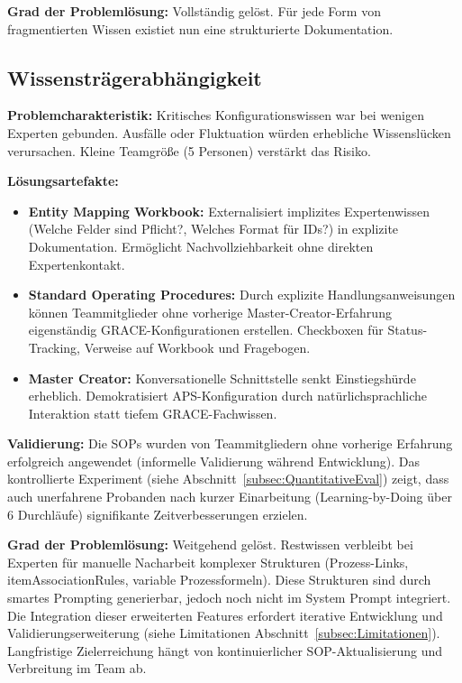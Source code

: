 \noindent \textbf{Grad der Problemlösung:} Vollständig gelöst. Für jede Form von fragmentierten Wissen existiet nun eine strukturierte Dokumentation. 


\subsection{Wissensträgerabhängigkeit}
\label{subsec:WissensträgerEval}

\textbf{Problemcharakteristik:} Kritisches Konfigurationswissen war bei wenigen Experten gebunden. Ausfälle oder Fluktuation würden erhebliche Wissenslücken verursachen. Kleine Teamgröße (5 Personen) verstärkt das Risiko.

\noindent \textbf{Lösungsartefakte:}

\begin{itemize}
    \item \textbf{Entity Mapping Workbook:} Externalisiert implizites Expertenwissen (\glqq Welche Felder sind Pflicht?\grqq{}, \glqq Welches Format für IDs?\grqq{}) in explizite Dokumentation. Ermöglicht Nachvollziehbarkeit ohne direkten Expertenkontakt.

    \item \textbf{Standard Operating Procedures:} Durch explizite Handlungsanweisungen können Teammitglieder ohne vorherige Master-Creator-Erfahrung eigenständig GRACE-Konfigurationen erstellen. Checkboxen für Status-Tracking, Verweise auf Workbook und Fragebogen.

    \item \textbf{Master Creator:} Konversationelle Schnittstelle senkt Einstiegshürde erheblich. Demokratisiert APS-Konfiguration durch natürlichsprachliche Interaktion statt tiefem GRACE-Fachwissen.
\end{itemize}

\noindent \textbf{Validierung:} Die SOPs wurden von Teammitgliedern ohne vorherige Erfahrung erfolgreich angewendet (informelle Validierung während Entwicklung). Das kontrollierte Experiment (siehe Abschnitt~\ref{subsec:QuantitativeEval}) zeigt, dass auch unerfahrene Probanden nach kurzer Einarbeitung (Learning-by-Doing über 6 Durchläufe) signifikante Zeitverbesserungen erzielen.

\noindent \textbf{Grad der Problemlösung:} Weitgehend gelöst. Restwissen verbleibt bei Experten für manuelle Nacharbeit komplexer Strukturen (Prozess-Links, itemAssociationRules, variable Prozessformeln). Diese Strukturen sind durch smartes Prompting generierbar, jedoch noch nicht im System Prompt integriert. Die Integration dieser erweiterten Features erfordert iterative Entwicklung und Validierungserweiterung (siehe Limitationen Abschnitt~\ref{subsec:Limitationen}). Langfristige Zielerreichung hängt von kontinuierlicher SOP-Aktualisierung und Verbreitung im Team ab.


